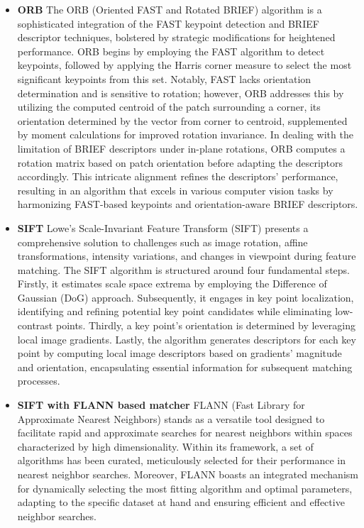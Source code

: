 \begin{itemize}
  \item \textbf{ORB}\newline
  The ORB (Oriented FAST and Rotated BRIEF) algorithm is a sophisticated integration of the FAST keypoint detection and BRIEF descriptor techniques, bolstered by strategic modifications for heightened performance. ORB begins by employing the FAST algorithm to detect keypoints, followed by applying the Harris corner measure to select the most significant keypoints from this set. Notably, FAST lacks orientation determination and is sensitive to rotation; however, ORB addresses this by utilizing the computed centroid of the patch surrounding a corner, its orientation determined by the vector from corner to centroid, supplemented by moment calculations for improved rotation invariance. In dealing with the limitation of BRIEF descriptors under in-plane rotations, ORB computes a rotation matrix based on patch orientation before adapting the descriptors accordingly. This intricate alignment refines the descriptors' performance, resulting in an algorithm that excels in various computer vision tasks by harmonizing FAST-based keypoints and orientation-aware BRIEF descriptors.
  \item \textbf{SIFT}\newline
  Lowe's Scale-Invariant Feature Transform (SIFT) presents a comprehensive solution to challenges such as image rotation, affine transformations, intensity variations, and changes in viewpoint during feature matching. The SIFT algorithm is structured around four fundamental steps. Firstly, it estimates scale space extrema by employing the Difference of Gaussian (DoG) approach. Subsequently, it engages in key point localization, identifying and refining potential key point candidates while eliminating low-contrast points. Thirdly, a key point's orientation is determined by leveraging local image gradients. Lastly, the algorithm generates descriptors for each key point by computing local image descriptors based on gradients' magnitude and orientation, encapsulating essential information for subsequent matching processes.
  \item \textbf{SIFT with FLANN based matcher}\newline
  FLANN (Fast Library for Approximate Nearest Neighbors) stands as a versatile tool designed to facilitate rapid and approximate searches for nearest neighbors within spaces characterized by high dimensionality. Within its framework, a set of algorithms has been curated, meticulously selected for their performance in nearest neighbor searches. Moreover, FLANN boasts an integrated mechanism for dynamically selecting the most fitting algorithm and optimal parameters, adapting to the specific dataset at hand and ensuring efficient and effective neighbor searches.
\end{itemize}

